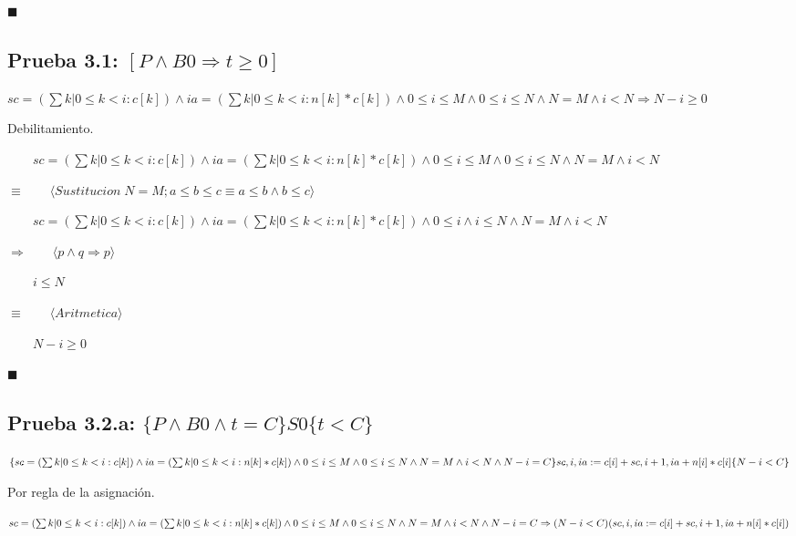 \documentclass[hidelinks]{article}
\begin{document}
$\blacksquare$

\newpage

\subsection*{Prueba 3.1: $[P \land B0 \Rightarrow t \geq 0]$}

$sc=(\sum k|0 \leq k < i: c[k]) \land ia=(\sum k|0 \leq k < i: n[k]*c[k]) \land 0 \leq i \leq M \land 0 \leq i \leq N \land N=M \land i < N \Rightarrow N-i \geq 0 $ \par

Debilitamiento. \par

$\qquad sc=(\sum k|0 \leq k < i: c[k]) \land ia=(\sum k|0 \leq k < i: n[k]*c[k]) \land 0 \leq i \leq M \land 0 \leq i \leq N \land N=M \land i < N $ \par
$\equiv  \qquad \langle Sustitucion \; N=M; a \leq b \leq c \equiv a \leq b \land b \leq c \rangle$ \par
$\qquad sc=(\sum k|0 \leq k < i: c[k]) \land ia=(\sum k|0 \leq k < i: n[k]*c[k]) \land 0 \leq i \land i \leq N \land N=M \land i < N $ \par
$\Rightarrow  \qquad \langle p \land q \Rightarrow p \rangle$ \par
$\qquad i \leq N $ \par
$\equiv  \qquad \langle Aritmetica \rangle$ \par
$\qquad N - i \geq 0 $ \par

$\blacksquare$

\newpage

\subsection*{Prueba 3.2.a: $\{P \land B0 \land t = C\} S0 \{t < C\}$}

$\{sc=(\sum k|0 \leq k < i: c[k]) \land ia=(\sum k|0 \leq k < i: n[k]*c[k]) \land 0 \leq i \leq M \land 0 \leq i \leq N \land N=M \land i < N \land N-i = C\} \\
    sc, i, ia := c[i]+sc, i + 1, ia+n[i]*c[i]\\
    \{N-i<C\} $ \par

Por regla de la asignación. \par

$sc=(\sum k|0 \leq k < i: c[k]) \land ia=(\sum k|0 \leq k < i: n[k]*c[k]) \land 0 \leq i \leq M \land 0 \leq i \leq N \land N=M \land i < N \land N-i = C \Rightarrow \\
    (N-i<C)(sc, i, ia := c[i]+sc, i + 1, ia+n[i]*c[i]) $ \par
\end{document}
